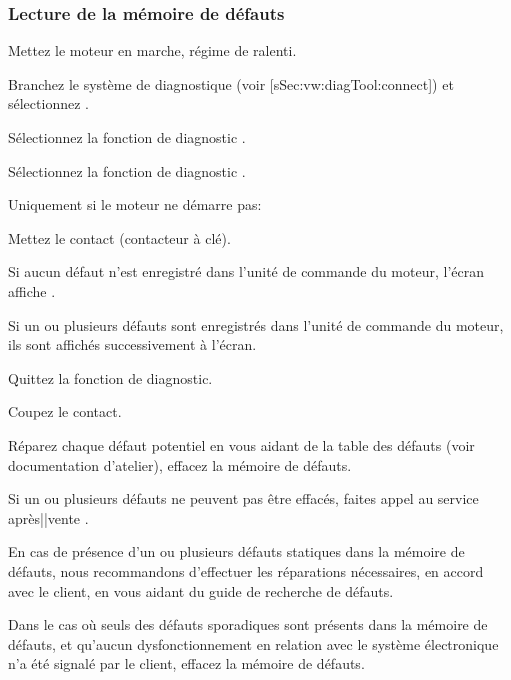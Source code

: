 \subsubsection{Lecture de la mémoire de défauts}


\startSteps
\item Mettez le moteur en marche, régime de ralenti.
\item Branchez le système de diagnostique (voir [sSec:vw:diagTool:connect])
et sélectionnez .
\item Sélectionnez la fonction de diagnostic .
\item Sélectionnez la fonction de diagnostic .
\stopSteps

{\sla Uniquement si le moteur ne démarre pas:}

\startitemize [2]
\item Mettez le contact (contacteur à clé).
\item Si aucun défaut n’est enregistré dans l’unité de commande du moteur,
l’écran affiche .
\item Si un ou plusieurs défauts sont enregistrés dans l’unité de commande du moteur,
ils sont affichés successivement à l’écran.
\item Quittez la fonction de diagnostic.
\item Coupez le contact.
\item Réparez chaque défaut potentiel en vous aidant de la table des défauts (voir documentation d’atelier),
effacez la mémoire de défauts.
\stopitemize

\starttextbackground [FC]
\startPictPar
\PMrtfm
\PictPar
Si un ou plusieurs défauts ne peuvent pas être effacés, faites appel au service après||vente \boschung.
\stopPictPar
\stoptextbackground



En cas de présence d’un ou plusieurs défauts statiques dans la mémoire de défauts,
nous recommandons d’effectuer les réparations nécessaires, en accord avec le client,
en vous aidant du guide de recherche de défauts.




Dans le cas où seuls des défauts sporadiques sont présents dans la mémoire de défauts,
et qu’aucun dysfonctionnement en relation avec le système électronique n’a été signalé par le client,
effacez la mémoire de défauts.

